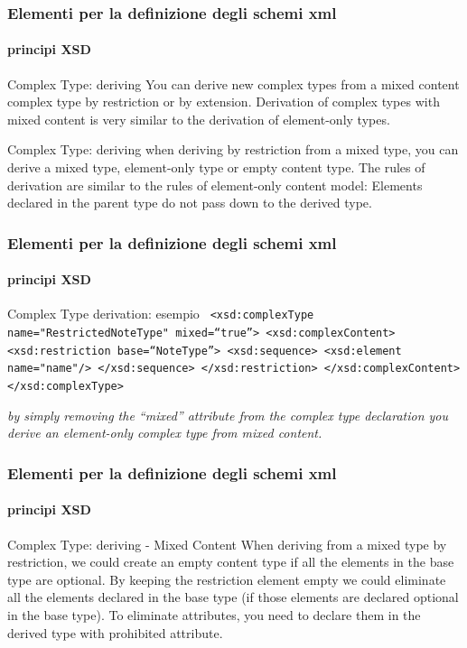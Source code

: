\begin{frame}
	\frametitle{Elementi per la definizione degli schemi xml}
	\framesubtitle{principi XSD}
	\addtocounter{nframe}{1}

	\begin{block}{Complex Type: deriving }
		You can derive new complex types from a mixed content complex type by restriction or by extension. Derivation of complex types with mixed content is very similar to the derivation of element-only types.
	\end{block}

	\begin{block}{Complex Type: deriving}
		when deriving by restriction from a mixed type, you can derive a mixed type, element-only type or empty content type. The rules of derivation are similar to the rules of element-only content model: Elements declared in the parent type do not pass down to the derived type.
	\end{block}
\end{frame}



\begin{frame}
	\frametitle{Elementi per la definizione degli schemi xml}
	\framesubtitle{principi XSD}
	\addtocounter{nframe}{1}

	\begin{block}{Complex Type derivation: esempio}
		\texttt{
			<xsd:complexType name="RestrictedNoteType" mixed=``true''>
			<xsd:complexContent>
			<xsd:restriction base=``NoteType''>
			<xsd:sequence>
			<xsd:element name="name"/>
			</xsd:sequence>
			</xsd:restriction>
			</xsd:complexContent>
			</xsd:complexType>
		}
	\end{block}
	\textit{by simply removing the ``mixed'' attribute from the complex type declaration you derive an element-only complex type from mixed content.}
\end{frame}

\begin{frame}
	\frametitle{Elementi per la definizione degli schemi xml}
	\framesubtitle{principi XSD}
	\addtocounter{nframe}{1}
	\begin{block}{Complex Type: deriving - Mixed Content}
		When deriving from a mixed type by restriction, we could create an empty content type if all the elements in the base type are optional. By keeping the restriction element empty we could eliminate all the elements declared in the base type (if those elements are declared optional in the base type). To eliminate attributes, you need to declare them in the derived type with prohibited attribute.
	\end{block}
\end{frame}

